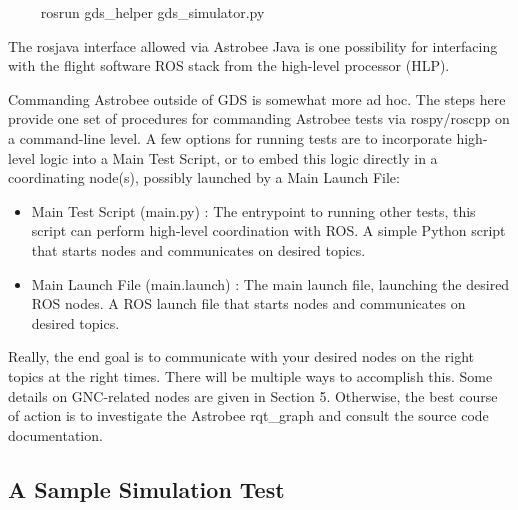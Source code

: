 \documentclass{article}
\begin{document}
\begin{markdown}
~~~~
rosrun gds_helper gds_simulator.py
~~~~
\end{markdown}

The rosjava interface allowed via Astrobee Java is one possibility for interfacing with the flight software ROS stack from the high-level processor (HLP).

Commanding Astrobee outside of GDS is somewhat more ad hoc. The steps here provide one set of procedures for commanding Astrobee tests via rospy/roscpp on a command-line level. A few options for running tests are to incorporate high-level logic into a Main Test Script, or to embed this logic directly in a coordinating node(s), possibly launched by a Main Launch File:
\begin{itemize}
    \item Main Test Script (main.py) : The entrypoint to running other tests, this script can perform high-level coordination with ROS. A simple Python script that starts nodes and communicates on desired topics.
    \item Main Launch File (main.launch) : The main launch file, launching the desired ROS nodes. A ROS launch file that starts nodes and communicates on desired topics.
\end{itemize}

Really, the end goal is to communicate with your desired nodes on the right topics at the right times. There will be multiple ways to accomplish this. Some details on GNC-related nodes are given in Section 5. Otherwise, the best course of action is to investigate the Astrobee rqt\_graph and consult the source code documentation.

\subsection{A Sample Simulation Test}
\end{document}
